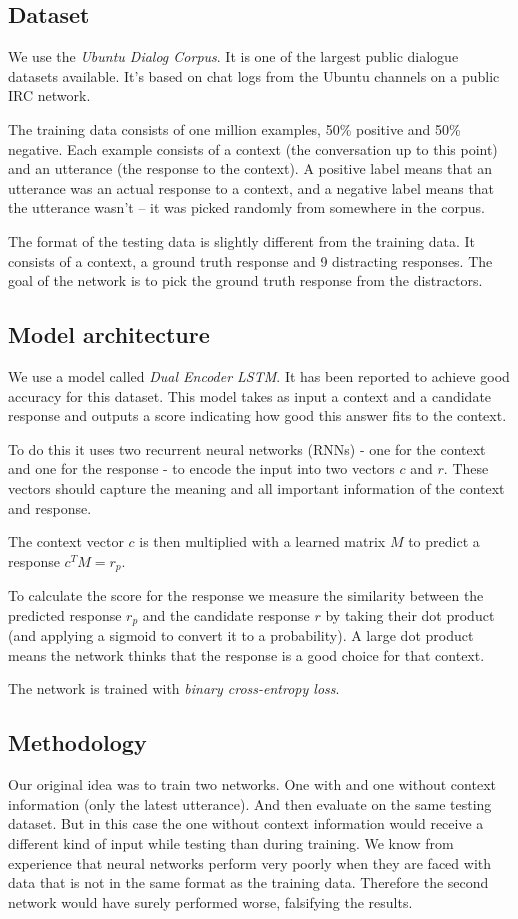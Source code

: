 \documentclass[conference]{IEEEtran}
\begin{document}
\subsection{Dataset}
We use the \emph{Ubuntu Dialog Corpus}\cite{lowe2015ubuntu}. It is one of the largest public dialogue datasets available. It’s based on chat logs from the Ubuntu channels on a public IRC network.

The training data consists of one million examples, 50\% positive and 50\% negative. Each example consists of a context (the conversation up to this point) and an utterance (the response to the context). A positive label means that an utterance was an actual response to a context, and a negative label means that the utterance wasn’t – it was picked randomly from somewhere in the corpus.\cite{WILDML}

The format of the testing data is slightly different from the training data. It consists of a context, a ground truth response and 9 distracting responses. The goal of the network is to pick the ground truth response from the distractors.

\subsection{Model architecture}
\label{model_architecture}
We use a model called \emph{Dual Encoder LSTM}\cite{lowe2015ubuntu}. It has been reported to achieve good accuracy for this dataset\cite{kadlec2015improved}. This model takes as input a context and a candidate response and outputs a score indicating how good this answer fits to the context.

To do this it uses two recurrent neural networks (RNNs) - one for the context and one for the response - to encode the input into two vectors $c$ and $r$. These vectors should capture the meaning and all important information of the context and response.

The context vector $c$ is then multiplied with a learned matrix $M$ to predict a response  $c^TM = r_p$.

To calculate the score for the response we measure the similarity between the predicted response $r_p$ and the candidate response $r$ by taking their dot product (and applying a sigmoid to convert it to a probability). A large dot product means the network thinks that the response is a good choice for that context.

The network is trained with \emph{binary cross-entropy loss}.

\subsection{Methodology}
Our original idea was to train two networks. One with and one without context information (only the latest utterance). And then evaluate on the same testing dataset. But in this case the one without context information would receive a different kind of input while testing than during training. We know from experience that neural networks perform very poorly when they are faced with data that is not in the same format as the training data. Therefore the second network would have surely performed worse, falsifying the results.
\end{document}
